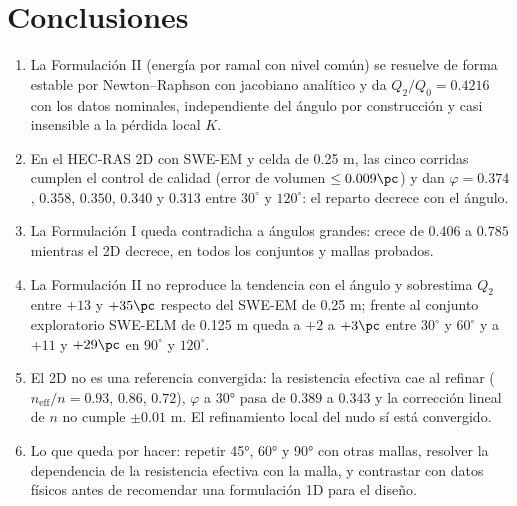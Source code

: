 \section{Conclusiones}\label{sec:conclusiones}
\begin{enumerate}[label=\arabic*)]
\item La Formulación II (energía por ramal con nivel común) se resuelve de forma estable por Newton--Raphson con jacobiano analítico y da $Q_2/Q_0=0.4216$ con los datos nominales, independiente del ángulo por construcción y casi insensible a la pérdida local $K$.
\item En el HEC-RAS 2D con SWE-EM y celda de 0.25 m, las cinco corridas cumplen el control de calidad (error de volumen $\leq0.009\pc$) y dan $\varphi=0.374$, $0.358$, $0.350$, $0.340$ y $0.313$ entre $30^\circ$ y $120^\circ$: el reparto decrece con el ángulo.
\item La Formulación I queda contradicha a ángulos grandes: crece de $0.406$ a $0.785$ mientras el 2D decrece, en todos los conjuntos y mallas probados.
\item La Formulación II no reproduce la tendencia con el ángulo y sobrestima $Q_2$ entre $+13$ y $+35\pc$ respecto del SWE-EM de 0.25 m; frente al conjunto exploratorio SWE-ELM de 0.125 m queda a $+2$ a $+3\pc$ entre $30^\circ$ y $60^\circ$ y a $+11$ y $+29\pc$ en $90^\circ$ y $120^\circ$.
\item El 2D no es una referencia convergida: la resistencia efectiva cae al refinar ($n_\mathrm{eff}/n=0.93$, $0.86$, $0.72$), $\varphi$ a 30° pasa de $0.389$ a $0.343$ y la corrección lineal de $n$ no cumple $\pm0.01$ m. El refinamiento local del nudo sí está convergido.
\item Lo que queda por hacer: repetir 45°, 60° y 90° con otras mallas, resolver la dependencia de la resistencia efectiva con la malla, y contrastar con datos físicos antes de recomendar una formulación 1D para el diseño.
\end{enumerate}
